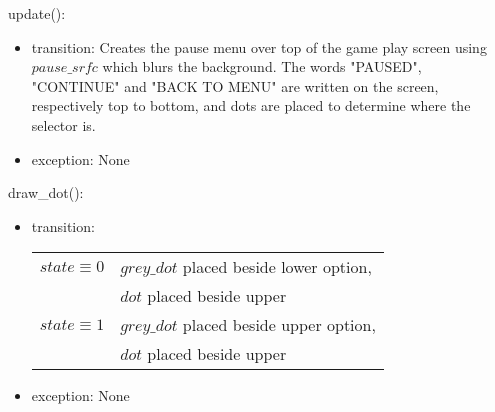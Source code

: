 \documentclass[12pt]{article}
\begin{document}
\noindent update():
\begin{itemize}
    \item transition: Creates the pause menu over top of the game play screen using $pause\_srfc$ which blurs the background. The words "PAUSED", "CONTINUE" and "BACK TO MENU" are written on the screen, respectively top to bottom, and dots are placed to determine where the selector is. 
    
    \item exception: None
\end{itemize}

\noindent draw\_dot():
\begin{itemize}
    \item transition:
    
    \begin{tabular}{|l|l|}
    \hline
    $state \equiv 0$ & $grey\_dot$ placed beside lower option, \\
     & $dot$ placed beside upper \\
    \hline
    $state \equiv 1$ \equiv 60 & $grey\_dot$ placed beside upper option, \\
     & $dot$ placed beside upper \\
    \hline
    \end{tabular}
    
    \item exception: None
\end{itemize}
\end{document}
